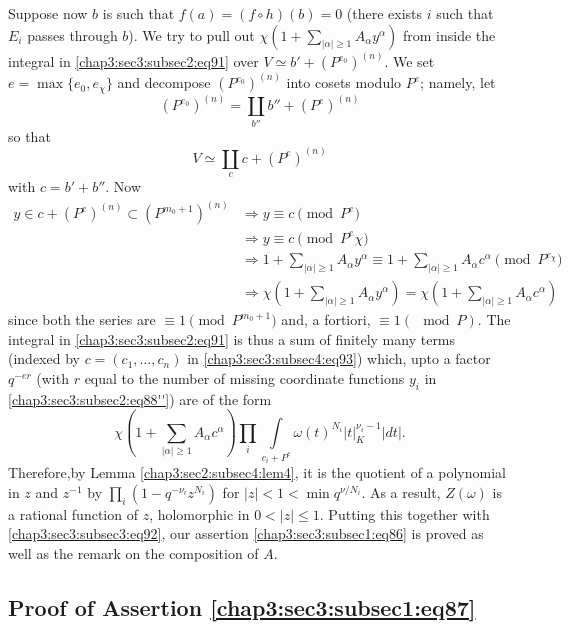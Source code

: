 Suppose now $b$ is such that $f(a)=(f\circ h)(b)=0$ (\ie there exists
$i$ such that $E_{i}$ passes through $b$). We try to pull out
$\chi\left(1+\sum\limits_{|\alpha|\geq 1}A_{\alpha}y^{\alpha}\right)$
from inside the integral in \ref{chap3:sec3:subsec2:eq91} over $V\simeq
b'+(P^{e_{0}})^{(n)}$. We set $e=\max\{e_{0},e_{\chi}\}$ and decompose
$(P^{e_{0}})^{(n)}$ into cosets modulo $P^{e}$; namely, let
$$
(P^{e_{0}})^{(n)}=\coprod_{b''}b''+(P^{e})^{(n)}
$$
so that
\begin{equation*}
  V\simeq \coprod_{c}c+(P^{e})^{(n)}\tag{93}\label{chap3:sec3:subsec4:eq93}
\end{equation*}
with $c=b'+b''$. Now
{\fontsize{10}{12}\selectfont
\begin{align*}
  y\in c+(P^{e})^{(n)}\subset (P^{m_{0}+1})^{(n)} &\Rightarrow y\equiv
  c\pmod{P^{e}}\\
  &\Rightarrow y\equiv c \pmod{P^{e}\chi}\\
  &\Rightarrow 1+\sum\limits_{|\alpha|\geq 1}A_{\alpha}y^{\alpha}\equiv
  1+\sum\limits_{|\alpha|\geq 1}A_{\alpha}c^{\alpha} \pmod{P^{e_{\chi}}}\\
  &\Rightarrow \chi\left(1+\sum\limits_{|\alpha|\geq
    1}A_{\alpha}y^{\alpha}\right)=\chi\left(1+\sum\limits_{|\alpha|\geq
  1}A_{\alpha}c^{\alpha}\right) 
\end{align*}}
since both the series are $\equiv 1 \pmod{P^{m_{0}+1}}$ and, a
fortiori, $\equiv 1(\mod P)$. The integral in \ref{chap3:sec3:subsec2:eq91} is thus a sum
of finitely many terms (indexed by $c=(c_{1},\ldots,c_{n})$ in
\ref{chap3:sec3:subsec4:eq93}) which, upto a factor $q^{-er}$ (with
$r$ equal to the 
number of missing coordinate functions $y_{i}$
in \ref{chap3:sec3:subsec2:eq88''}) are of the
form
$$
\chi\left(1+\sum\limits_{|\alpha|\geq
  1}A_{\alpha}c^{\alpha}\right)\prod_{i}\int\limits_{c_{i}+P^{e}}
\omega(t)^{N_{i}}|t|^{\nu_{i}-1}_{K}|dt|.
$$
Therefore,\pageoriginale by Lemma \ref{chap3:sec2:subsec4:lem4}, it is
the quotient of a polynomial 
in $z$ and $z^{-1}$ by $\prod\limits_{i}(1-q^{-\nu_{i}}z^{N_{i}})$ for
$|z|<1<\min q^{\nu/N_{i}}$. As a result, $Z(\omega)$ is a rational
function of $z$, holomorphic in $0<|z|\leq 1$. Putting this together
with \ref{chap3:sec3:subsec3:eq92}, our assertion
\ref{chap3:sec3:subsec1:eq86} is proved as well as the remark on the
composition of $A$. 

\subsection{Proof of Assertion \ref{chap3:sec3:subsec1:eq87}} %

